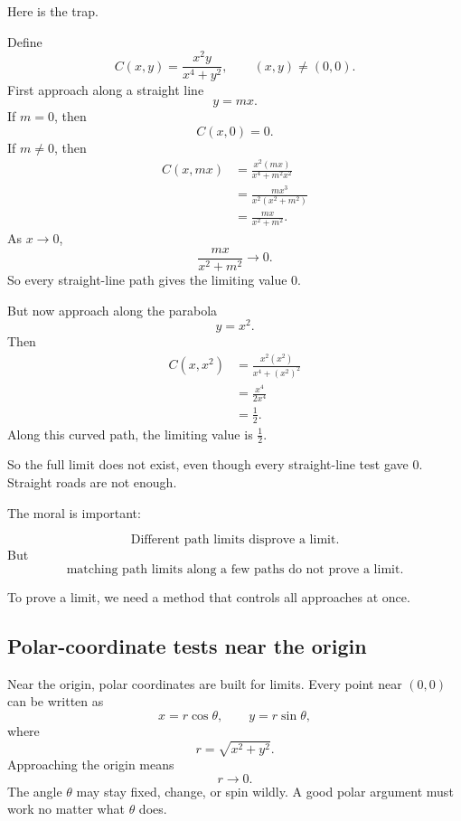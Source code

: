 Here is the trap.

\begin{example}
Define
\[
    C(x,y)=\frac{x^2y}{x^4+y^2},
    \qquad (x,y)\ne(0,0).
\]
First approach along a straight line
\[
    y=mx.
\]
If \(m=0\), then
\[
    C(x,0)=0.
\]
If \(m\ne0\), then
\[
\begin{aligned}
    C(x,mx)
    &=
    \frac{x^2(mx)}{x^4+m^2x^2}       \\
    &=
    \frac{mx^3}{x^2(x^2+m^2)}        \\
    &=
    \frac{mx}{x^2+m^2}.
\end{aligned}
\]
As \(x\to0\),
\[
    \frac{mx}{x^2+m^2}\to0.
\]
So every straight-line path gives the limiting value \(0\).

But now approach along the parabola
\[
    y=x^2.
\]
Then
\[
\begin{aligned}
    C(x,x^2)
    &=
    \frac{x^2(x^2)}{x^4+(x^2)^2} \\
    &=
    \frac{x^4}{2x^4}             \\
    &=
    \frac12.
\end{aligned}
\]
Along this curved path, the limiting value is \(\frac12\).

So the full limit does not exist, even though every straight-line test gave \(0\).
Straight roads are not enough.
\end{example}

The moral is important:

\[
    \text{Different path limits disprove a limit.}
\]
But
\[
    \text{matching path limits along a few paths do not prove a limit.}
\]

To prove a limit, we need a method that controls all approaches at once.

\subsection{Polar-coordinate tests near the origin}

Near the origin, polar coordinates are built for limits.  Every point near \((0,0)\) can
be written as
\[
    x=r\cos\theta,\qquad y=r\sin\theta,
\]
where
\[
    r=\sqrt{x^2+y^2}.
\]
Approaching the origin means
\[
    r\to0.
\]
The angle \(\theta\) may stay fixed, change, or spin wildly.  A good polar argument
must work no matter what \(\theta\) does.

